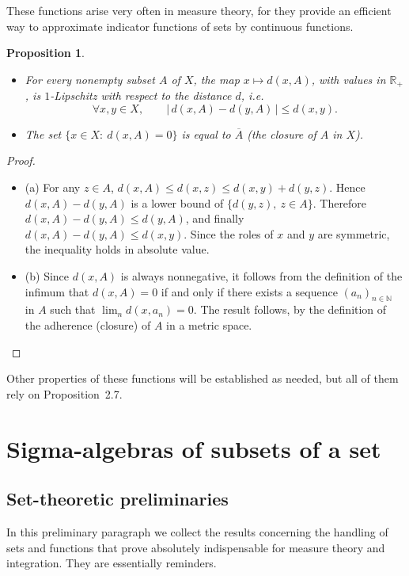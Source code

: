 \documentclass[11pt]{article}
\newtheorem{proposition}{Proposition}[section]
\theoremstyle{definition}
\begin{document}
These functions arise very often in measure theory, for they provide an efficient way to approximate indicator functions of sets by continuous functions.

\begin{proposition}
\begin{itemize}[leftmargin=1.5em]
\item[(a)] For every nonempty subset $A$ of $X$, the map $x\mapsto d(x,A)$, with values in $\mathbb{R}_+$, is $1$-Lipschitz with respect to the distance $d$, i.e.
\[
\forall x,y\in X,\qquad |\,d(x,A)-d(y,A)\,|\le d(x,y).
\]
\item[(b)] The set $\{x\in X:\ d(x,A)=0\}$ is equal to $\overline{A}$ (the closure of $A$ in $X$).
\end{itemize}
\end{proposition}

\begin{proof}
\begin{itemize}
\item (a) For any $z\in A$, $d(x,A)\le d(x,z)\le d(x,y)+d(y,z)$.
Hence $d(x,A)-d(y,A)$ is a lower bound of $\{d(y,z),\ z\in A\}$.
Therefore $d(x,A)-d(y,A)\le d(y,A)$, and finally $d(x,A)-d(y,A)\le d(x,y)$.
Since the roles of $x$ and $y$ are symmetric, the inequality holds in absolute value.

\item (b) Since $d(x,A)$ is always nonnegative, it follows from the definition of the infimum that $d(x,A)=0$ if and only if there exists a sequence $(a_n)_{n\in\mathbb{N}}$ in $A$ such that $\lim_{n} d(x,a_n)=0$.
The result follows, by the definition of the adherence (closure) of $A$ in a metric space.
\end{itemize}
\end{proof}

Other properties of these functions will be established as needed, but all of them rely on Proposition~2.7.

\newpage
\section{Sigma-algebras of subsets of a set}
\subsection{Set-theoretic preliminaries}
In this preliminary paragraph we collect the results concerning the handling of sets and functions that prove absolutely indispensable for measure theory and integration. They are essentially reminders.
\end{document}
